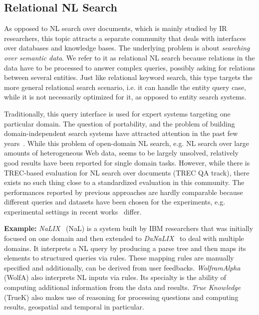 \subsection{Relational NL Search} As opposed to NL search over documents, which is mainly studied by IR researchers, this topic attracts a separate community that deals with interfaces over databases and knowledge bases. The underlying problem is about \emph{searching over semantic data}. We refer to it as relational NL search because relations in the data have to be processed to answer complex queries, possibly asking for relations between several entities. Just like relational keyword search, this type targets the more general relational search scenario, i.e. it can handle the entity query case, while it is not necessarily optimized for it, as opposed to entity search systems.  

Traditionally, this query interface is used for expert systems targeting one particular domain.  The question of portability, and the problem of building domain-independent search systems have attracted attention in the past few years~\cite{DBLP:conf/esws/WangXZY07,DBLP:journals/dke/CimianoHHMS08,DBLP:conf/aaai/LiCYSJ07}. While this problem of open-domain NL search, e.g. NL search over large amounts of heterogeneous Web data, seems to be largely unsolved, relatively good results have been reported for single domain tasks. However, while there is TREC-based evaluation for NL search over documents (TREC QA track), there exists no such thing close to a standardized evaluation in this community. The performances reported by previous approaches are hardly comparable because different queries and datasets have been chosen for the experiments, e.g. experimental settings in recent works~\cite{DBLP:conf/esws/DamljanovicAC10,DBLP:conf/iui/HanNPPL10,DBLP:journals/tods/LiYJ07} differ. 

\textbf{Example:} \emph{NaLIX}~\cite{DBLP:journals/tods/LiYJ07} (NaL) is a system built by IBM researchers that was initially focused on one domain and then extended to \emph{DaNaLIX}~\cite{DBLP:conf/aaai/LiCYSJ07} to deal with multiple domains. It interprets a NL query by producing a parse tree and then maps its elements to structured queries via rules. These mapping rules are manually specified and additionally, can be derived from user feedbacks. \emph{WolframAlpha} (WolfA) also interprets NL inputs via rules. Its specialty is the ability of computing additional information from the data and results. \emph{True Knowledge} (TrueK) also makes use of reasoning for processing questions and computing results, geospatial and temporal in particular. 



